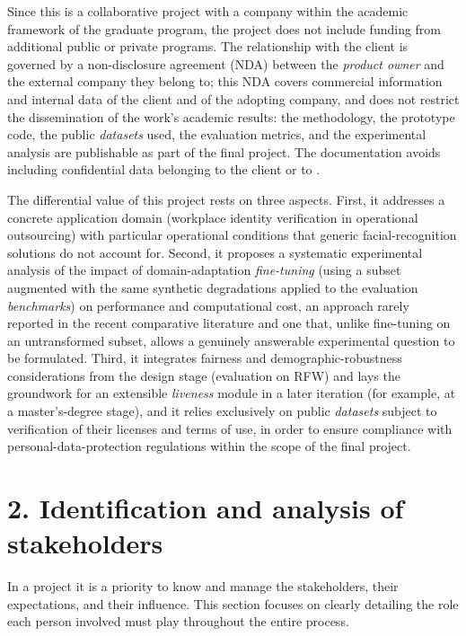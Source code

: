 \documentclass[
  11pt, %
]{charter}
\begin{document}
Since this is a collaborative project with a company within the academic framework of the graduate program, the project does not include funding from additional public or private programs. The relationship with the client is governed by a non-disclosure agreement (NDA) between the \textit{product owner} and the external company they belong to; this NDA covers commercial information and internal data of the client and of the adopting company, and does not restrict the dissemination of the work's academic results: the methodology, the prototype code, the public \textit{datasets} used, the evaluation metrics, and the experimental analysis are publishable as part of the final project. The documentation avoids including confidential data belonging to the client or to \empclientename.

The differential value of this project rests on three aspects. First, it addresses a concrete application domain (workplace identity verification in operational outsourcing) with particular operational conditions that generic facial-recognition solutions do not account for. Second, it proposes a systematic experimental analysis of the impact of domain-adaptation \textit{fine-tuning} (using a subset augmented with the same synthetic degradations applied to the evaluation \textit{benchmarks}) on performance and computational cost, an approach rarely reported in the recent comparative literature and one that, unlike fine-tuning on an untransformed subset, allows a genuinely answerable experimental question to be formulated. Third, it integrates fairness and demographic-robustness considerations from the design stage (evaluation on RFW) and lays the groundwork for an extensible \textit{liveness} module in a later iteration (for example, at a master's-degree stage), and it relies exclusively on public \textit{datasets} subject to verification of their licenses and terms of use, in order to ensure compliance with personal-data-protection regulations within the scope of the final project.

\section{2. Identification and analysis of stakeholders}
\label{sec:interesados}

In a project it is a priority to know and manage the stakeholders, their expectations, and their influence. This section focuses on clearly detailing the role each person involved must play throughout the entire process.
\end{document}
